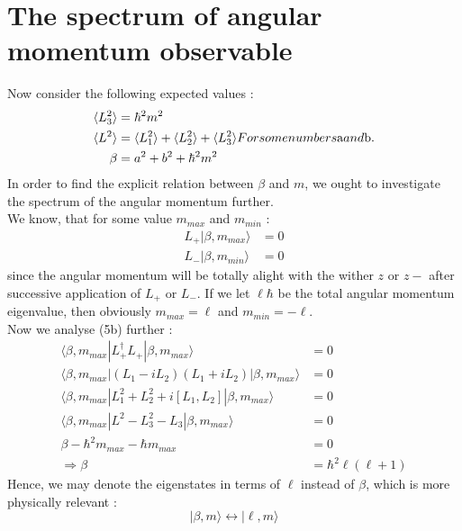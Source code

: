 \section{The spectrum of angular momentum observable}
Now consider the following expected values :
\begin{subequations}
	\begin{align}
	\langle L _3 ^ 2\rangle &=  \hbar ^2 m^ 2 \\
	\langle L^ 2\rangle &= \langle L_1 ^ 2\rangle + \langle L_2 ^ 2\rangle+ \langle L_3 ^ 2\rangle \nonumber \\
	\beta 	&= a^2 +b^2 + \hbar ^2 m^ 2
	\end{align} 
	For some numbers $a$ and $b$.
\end{subequations}
In order to find the explicit relation between $\beta$ and $m$, we ought to investigate the spectrum of the angular momentum further. \\
We know, that for some value $m_{max}$ and $m_{min} $ : \begin{subequations}
	\begin{align}
	L_+ | \beta, m_{max}\rangle &= 0 \\
	L_-| \beta, m_{min}\rangle &= 0
	\end{align}
\end{subequations}
since the angular momentum will be totally alight with the wither $z$ or $z-$ after successive application of $L_+$ or $L_-$. If we let $\ell \hbar$ be the total angular momentum eigenvalue, then obviously $ m_{max} = \ell$ and $ m_{min} = - \ell$. \\
Now we analyse (5b) further :
\begin{align}
\langle\beta , m_{max }| L_+^ \dagger L_+ | \beta , m_{max} \rangle &= 0 \nonumber \\
\langle\beta , m_{max}| (L_1 -i L_2) 
(L_1+iL_2)  | \beta , m_{max} \rangle &= 0 \nonumber \\
\langle\beta , m_{max}| L_1^2 +L_2^2+i[L_1,L_2] | \beta , m_{max} \rangle &= 0 \nonumber \\
\langle\beta , m_{max}| L^2-L^2_3-L_3| \beta , m_{max} \rangle &= 0 \nonumber \\
\beta-\hbar^2m_{max}-\hbar m_{max}&=0 \nonumber \\
\Rightarrow \beta &= \hbar^2\ell(\ell+1)
\end{align}
Hence, we may denote the eigenstates in terms of $\ell$ instead of $\beta$, which is more physically relevant :
\[
| \beta,m \rangle \longleftrightarrow | \ell, m\rangle
\]
